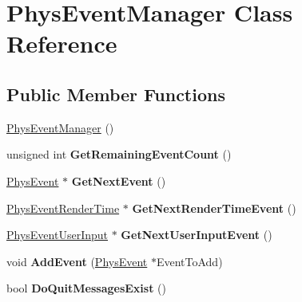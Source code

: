 \hypertarget{classPhysEventManager}{
\section{PhysEventManager Class Reference}
\label{d5/dd7/classPhysEventManager}
}
\subsection*{Public Member Functions}
\begin{DoxyCompactItemize}
\item 
\hyperlink{classPhysEventManager_a217e7f6006aaf5e08e2872fa4d66e5e2}{PhysEventManager} ()
\item 
\hypertarget{classPhysEventManager_ab14d238e7abe9919be8e2d9eef388b64}{
unsigned int {\bfseries GetRemainingEventCount} ()}
\label{d5/dd7/classPhysEventManager_ab14d238e7abe9919be8e2d9eef388b64}

\item 
\hypertarget{classPhysEventManager_a6de94bc6c23dcbd7e15785cadee2e80b}{
\hyperlink{classPhysEvent}{PhysEvent} $\ast$ {\bfseries GetNextEvent} ()}
\label{d5/dd7/classPhysEventManager_a6de94bc6c23dcbd7e15785cadee2e80b}

\item 
\hypertarget{classPhysEventManager_a1f2d0506ce816176913e5bdfaa9fd724}{
\hyperlink{classPhysEventRenderTime}{PhysEventRenderTime} $\ast$ {\bfseries GetNextRenderTimeEvent} ()}
\label{d5/dd7/classPhysEventManager_a1f2d0506ce816176913e5bdfaa9fd724}

\item 
\hypertarget{classPhysEventManager_a4874a9b1138d2351bf28e527a66c02b8}{
\hyperlink{classPhysEventUserInput}{PhysEventUserInput} $\ast$ {\bfseries GetNextUserInputEvent} ()}
\label{d5/dd7/classPhysEventManager_a4874a9b1138d2351bf28e527a66c02b8}

\item 
\hypertarget{classPhysEventManager_a7c9bb46b17f6d9245817a402dc6a2f6f}{
void {\bfseries AddEvent} (\hyperlink{classPhysEvent}{PhysEvent} $\ast$EventToAdd)}
\label{d5/dd7/classPhysEventManager_a7c9bb46b17f6d9245817a402dc6a2f6f}

\item 
\hypertarget{classPhysEventManager_a77b22f706d22914602982cbcaf05bba9}{
bool {\bfseries DoQuitMessagesExist} ()}
\label{d5/dd7/classPhysEventManager_a77b22f706d22914602982cbcaf05bba9}

\end{DoxyCompactItemize}

